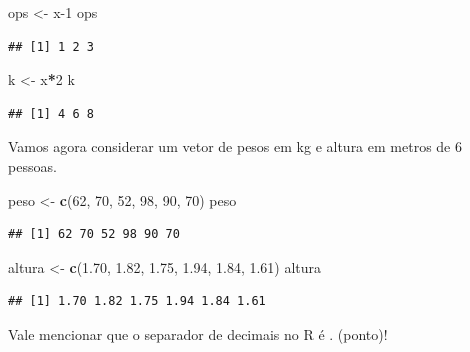\documentclass[
]{book}
\newenvironment{Shaded}{\begin{snugshade}}{\end{snugshade}}
\newcommand{\DecValTok}[1]{\textcolor[rgb]{0.00,0.00,0.81}{#1}}
\newcommand{\FloatTok}[1]{\textcolor[rgb]{0.00,0.00,0.81}{#1}}
\newcommand{\KeywordTok}[1]{\textcolor[rgb]{0.13,0.29,0.53}{\textbf{#1}}}
\newcommand{\NormalTok}[1]{#1}
\newcommand{\OperatorTok}[1]{\textcolor[rgb]{0.81,0.36,0.00}{\textbf{#1}}}
\newcommand{\StringTok}[1]{\textcolor[rgb]{0.31,0.60,0.02}{#1}}
\begin{document}
\begin{Shaded}
\begin{Highlighting}[]
\NormalTok{ops <-}\StringTok{ }\NormalTok{x}\DecValTok{-1}
\NormalTok{ops}
\end{Highlighting}
\end{Shaded}

\begin{verbatim}
## [1] 1 2 3
\end{verbatim}

\begin{Shaded}
\begin{Highlighting}[]
\NormalTok{k <-}\StringTok{ }\NormalTok{x}\OperatorTok{*}\DecValTok{2}
\NormalTok{k}
\end{Highlighting}
\end{Shaded}

\begin{verbatim}
## [1] 4 6 8
\end{verbatim}

Vamos agora considerar um vetor de pesos em kg e altura em metros de 6 pessoas.

\begin{Shaded}
\begin{Highlighting}[]
\NormalTok{peso <-}\StringTok{ }\KeywordTok{c}\NormalTok{(}\DecValTok{62}\NormalTok{, }\DecValTok{70}\NormalTok{, }\DecValTok{52}\NormalTok{, }\DecValTok{98}\NormalTok{, }\DecValTok{90}\NormalTok{, }\DecValTok{70}\NormalTok{)}
\NormalTok{peso}
\end{Highlighting}
\end{Shaded}

\begin{verbatim}
## [1] 62 70 52 98 90 70
\end{verbatim}

\begin{Shaded}
\begin{Highlighting}[]
\NormalTok{altura <-}\StringTok{ }\KeywordTok{c}\NormalTok{(}\FloatTok{1.70}\NormalTok{, }\FloatTok{1.82}\NormalTok{, }\FloatTok{1.75}\NormalTok{, }\FloatTok{1.94}\NormalTok{, }\FloatTok{1.84}\NormalTok{, }\FloatTok{1.61}\NormalTok{)}
\NormalTok{altura}
\end{Highlighting}
\end{Shaded}

\begin{verbatim}
## [1] 1.70 1.82 1.75 1.94 1.84 1.61
\end{verbatim}

Vale mencionar que o separador de decimais no R é . (ponto)!
\end{document}
